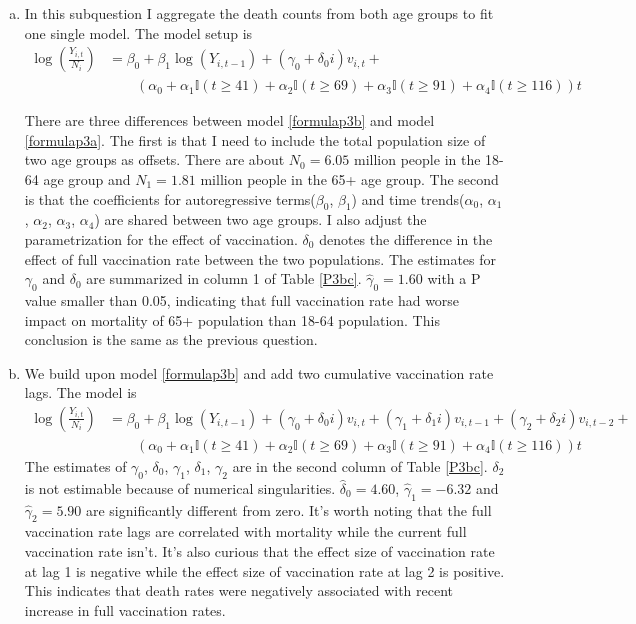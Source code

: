 \documentclass[12pt]{article}
\begin{document}
\begin{enumerate}[(a)]
\item 

In this subquestion I aggregate the death counts from both age groups to fit one single model. The model setup is
\begin{align}
	\log(\frac{Y_{i, t}}{N_{i}}) &= \beta_{0}+\beta_{1}\log(Y_{i, t-1})+ (\gamma_{0} + \delta_{0}i) v_{i, t} + \label{formulap3b} \\
	&\qquad \left(\alpha_{0} + \alpha_{1}\mathbb{I}(t \geq 41) + \alpha_{2}\mathbb{I}(t \geq 69) +\alpha_{3} \mathbb{I}(t \geq 91) + \alpha_{4}\mathbb{I}(t \geq 116)\right)t	\nonumber
\end{align}

There are three differences between model \ref{formulap3b} and model \ref{formulap3a}. The first is that I need to include the total population size of two age groups as offsets. There are about $N_{0}=6.05$ million people in the 18-64 age group and $N_{1}=1.81$ million people in the 65+ age group. The second is that the coefficients for autoregressive terms($\beta_{0}$, $\beta_{1}$) and time trends($\alpha_0$, $\alpha_1$, $\alpha_2$, $\alpha_3$, $\alpha_4$) are shared between two age groups. I also adjust the parametrization for the effect of vaccination. $\delta_0$ denotes the difference in the effect of full vaccination rate between the two populations. The estimates for $\gamma_0$ and $\delta_0$ are summarized in column 1 of Table \ref{P3bc}. $\hat{\gamma}_0 = 1.60$ with a P value smaller than 0.05, indicating that full vaccination rate had worse impact on mortality of 65+ population than 18-64 population. This conclusion is the same as the previous question.


\item We build upon model \ref{formulap3b} and add two cumulative vaccination rate lags. The model is
\begin{align}
	\log(\frac{Y_{i, t}}{N_{i}}) &= \beta_{0}+\beta_{1}\log(Y_{i, t-1})+ (\gamma_{0} + \delta_{0}i) v_{i, t} + (\gamma_{1} + \delta_{1}i) v_{i, t-1} + (\gamma_{2} + \delta_{2}i) v_{i, t-2} + \label{formulap3c} \\
	&\qquad \left(\alpha_{0} + \alpha_{1}\mathbb{I}(t \geq 41) + \alpha_{2}\mathbb{I}(t \geq 69) +\alpha_{3} \mathbb{I}(t \geq 91) + \alpha_{4}\mathbb{I}(t \geq 116)\right)t	\nonumber
\end{align}
The estimates of $\gamma_0$, $\delta_0$, $\gamma_1$, $\delta_1$, $\gamma_2$ are in the second column of Table \ref{P3bc}. $\delta_2$ is not estimable because of numerical singularities. $\hat{\delta}_0=4.60$, $\hat{\gamma}_1=-6.32$ and $\hat{\gamma}_2=5.90$ are significantly different from zero. It's worth noting that the full vaccination rate lags are correlated with mortality while the current full vaccination rate isn't. It's also curious that the  effect size of vaccination rate at lag 1 is negative while the effect size of vaccination rate at lag 2 is positive. This indicates that death rates were negatively associated with recent increase in full vaccination rates.


\end{enumerate}
\end{document}
